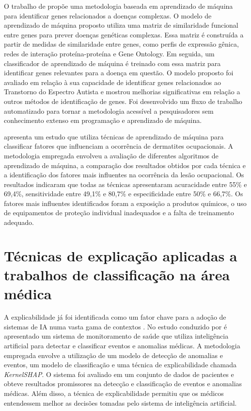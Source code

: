 O trabalho de  propõe uma metodologia baseada em aprendizado de máquina para identificar genes relacionados a doenças complexas. O modelo de aprendizado de máquina proposto utiliza uma matriz de similaridade funcional entre genes para prever doenças genéticas complexas. Essa matriz é construída a partir de medidas de similaridade entre genes, como perfis de expressão gênica, redes de interação proteína-proteína e Gene Ontology. Em seguida, um classificador de aprendizado de máquina é treinado com essa matriz para identificar genes relevantes para a doença em questão. O modelo proposto foi avaliado em relação à sua capacidade de identificar genes relacionados ao Transtorno do Espectro Autista e mostrou melhorias significativas em relação a outros métodos de identificação de genes. Foi desenvolvido um fluxo de trabalho automatizado para tornar a metodologia acessível a pesquisadores sem conhecimento extenso em programação e aprendizado de máquina.

 apresenta um estudo que utiliza técnicas de aprendizado de máquina para classificar fatores que influenciam a ocorrência de dermatites ocupacionais. A metodologia empregada envolveu a avaliação de diferentes algoritmos de aprendizado de máquina, a comparação dos resultados obtidos por cada técnica e a identificação dos fatores mais influentes na ocorrência da lesão ocupacional. Os resultados indicaram que todas as técnicas apresentaram acuracidade entre 55\% e 69,4\%, sensitividade entre 49,1\% e 80,7\% e especificidade entre 50\% e 66,7\%. Os fatores mais influentes identificados foram a exposição a produtos químicos, o uso de equipamentos de proteção individual inadequados e a falta de treinamento adequado.

\section{Técnicas de explicação aplicadas a trabalhos de classificação na área médica}\label{sec-context}

A explicabilidade já foi identificada como um fator chave para a adoção de sistemas de IA numa vasta gama de contextos \cite{doshivelez2017rigorous, lipton2017mythos, ribeiro2016modelagnostic}. No estudo conduzido por  é apresentado um sistema de monitoramento de saúde que utiliza inteligência artificial para detectar e classificar eventos e anomalias médicas. A metodologia empregada envolve a utilização de um modelo de detecção de anomalias e eventos, um modelo de classificação e uma técnica de explicabilidade chamada \textit{KernelSHAP}. O sistema foi avaliado em um conjunto de dados de pacientes e obteve resultados promissores na detecção e classificação de eventos e anomalias médicas. Além disso, a técnica de explicabilidade permitiu que os médicos entendessem melhor as decisões tomadas pelo sistema de inteligência artificial.

